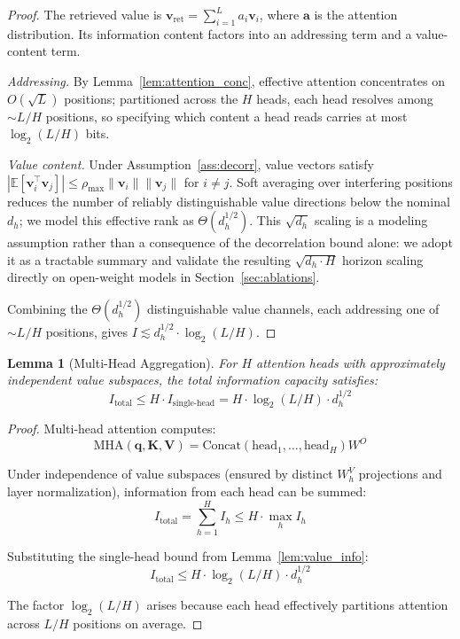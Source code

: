 \documentclass{article}
\theoremstyle{plain}
\newtheorem{lemma}[theorem]{Lemma}
\theoremstyle{definition}
\theoremstyle{remark}
\begin{document}
\begin{proof}
The retrieved value is $\mathbf{v}_\text{ret} = \sum_{i=1}^L a_i \mathbf{v}_i$, where $\mathbf{a}$ is the attention distribution. Its information content factors into an addressing term and a value-content term.

\emph{Addressing.} By Lemma~\ref{lem:attention_conc}, effective attention concentrates on $O(\sqrt{L})$ positions; partitioned across the $H$ heads, each head resolves among $\sim L/H$ positions, so specifying which content a head reads carries at most $\log_2(L/H)$ bits.

\emph{Value content.} Under Assumption~\ref{ass:decorr}, value vectors satisfy $|\mathbb{E}[\mathbf{v}_i^\top \mathbf{v}_j]| \leq \rho_{\max} \|\mathbf{v}_i\| \|\mathbf{v}_j\|$ for $i \neq j$. Soft averaging over interfering positions reduces the number of reliably distinguishable value directions below the nominal $d_h$; we model this effective rank as $\Theta(d_h^{1/2})$. This $\sqrt{d_h}$ scaling is a modeling assumption rather than a consequence of the decorrelation bound alone: we adopt it as a tractable summary and validate the resulting $\sqrt{d_h \cdot H}$ horizon scaling directly on open-weight models in Section~\ref{sec:ablations}.

Combining the $\Theta(d_h^{1/2})$ distinguishable value channels, each addressing one of $\sim L/H$ positions, gives $I \lesssim d_h^{1/2} \cdot \log_2(L/H)$.
\end{proof}

\begin{lemma}[Multi-Head Aggregation]
\label{lem:multihead}
For $H$ attention heads with approximately independent value subspaces, the total information capacity satisfies:
\begin{equation}
I_\text{total} \leq H \cdot I_\text{single-head} = H \cdot \log_2(L/H) \cdot d_h^{1/2}
\end{equation}
\end{lemma}

\begin{proof}
Multi-head attention computes:
\begin{equation}
\text{MHA}(\mathbf{q}, \mathbf{K}, \mathbf{V}) = \text{Concat}(\text{head}_1, \ldots, \text{head}_H) W^O
\end{equation}

Under independence of value subspaces (ensured by distinct $W^V_h$ projections and layer normalization), information from each head can be summed:
\begin{equation}
I_\text{total} = \sum_{h=1}^H I_h \leq H \cdot \max_h I_h
\end{equation}

Substituting the single-head bound from Lemma~\ref{lem:value_info}:
\begin{equation}
I_\text{total} \leq H \cdot \log_2(L/H) \cdot d_h^{1/2}
\end{equation}

The factor $\log_2(L/H)$ arises because each head effectively partitions attention across $L/H$ positions on average.
\end{proof}
\end{document}
